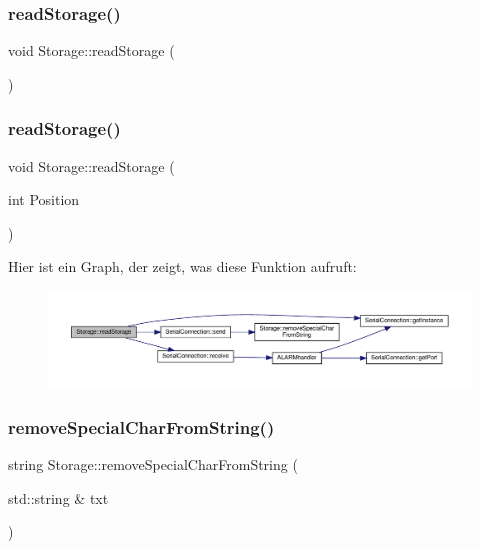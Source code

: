 \mbox{\label{class_storage_aff274782e2d75969248c380c1869bd0c}} 
\subsubsection{read\+Storage()\hspace{0.1cm}{\footnotesize\ttfamily [1/2]}}
{\footnotesize\ttfamily void Storage\+::read\+Storage (\begin{DoxyParamCaption}{ }\end{DoxyParamCaption})}

\mbox{\label{class_storage_a6b8c995a4ee57633e7c612bdb1714fbb}} 
\subsubsection{read\+Storage()\hspace{0.1cm}{\footnotesize\ttfamily [2/2]}}
{\footnotesize\ttfamily void Storage\+::read\+Storage (\begin{DoxyParamCaption}\item[{int}]{Position }\end{DoxyParamCaption})}

Hier ist ein Graph, der zeigt, was diese Funktion aufruft\+:\nopagebreak
\begin{figure}[H]
\begin{center}
\leavevmode
\includegraphics[width=350pt]{class_storage_a6b8c995a4ee57633e7c612bdb1714fbb_cgraph}
\end{center}
\end{figure}
\mbox{\label{class_storage_ad0b9a18790e8a1c56b349c1997ba4315}} 
\subsubsection{remove\+Special\+Char\+From\+String()}
{\footnotesize\ttfamily string Storage\+::remove\+Special\+Char\+From\+String (\begin{DoxyParamCaption}\item[{std\+::string \&}]{txt }\end{DoxyParamCaption})\hspace{0.3cm}{\ttfamily [protected]}}

